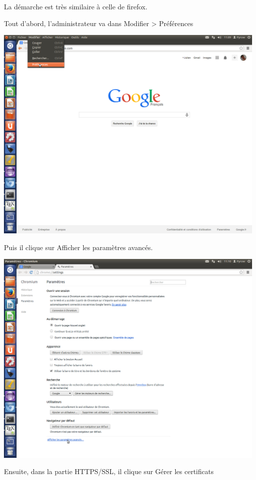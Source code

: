 \documentclass[a4paper,11pt,french]{book}
\begin{document}
La démarche est très similaire à celle de firefox.

Tout d'abord, l'administrateur va dans Modifier > Préférences

\includegraphics[width=\textwidth]{images/ChromePref.png} 
\newpage

Puis il clique sur Afficher les paramètres avancés.

\includegraphics[width=\textwidth]{images/ChromeAvance.png} 
\newpage

Ensuite, dans la partie HTTPS/SSL, il clique sur Gérer les certificats
\end{document}
